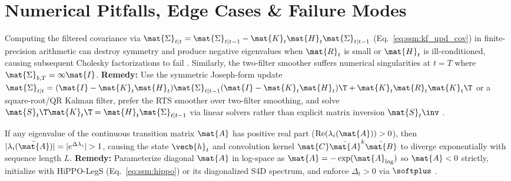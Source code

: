 \documentclass[../../../../master.tex]{subfiles}
\begin{document}
\section{Numerical Pitfalls, Edge Cases \& Failure Modes}\label{sec:ssm:pitfalls}

\begin{pitfall}
Computing the filtered covariance via $\mat{\Sigma}_{t|t} = \mat{\Sigma}_{t|t-1} - \mat{K}_t \mat{H}_t \mat{\Sigma}_{t|t-1}$ (Eq.~\eqref{eq:ssm:kf_upd_cov}) in finite-precision arithmetic can destroy symmetry and produce negative eigenvalues when $\mat{R}_t$ is small or $\mat{H}_t$ is ill-conditioned, causing subsequent Cholesky factorizations to fail . Similarly, the two-filter smoother suffers numerical singularities at $t=T$ where $\mat{\Sigma}_{b,T} = \infty \mat{I}$. \textbf{Remedy:} Use the symmetric Joseph-form update $\mat{\Sigma}_{t|t} = (\mat{I} - \mat{K}_t\mat{H}_t)\mat{\Sigma}_{t|t-1}(\mat{I} - \mat{K}_t\mat{H}_t)\T + \mat{K}_t \mat{R}_t \mat{K}_t\T$ or a square-root/QR Kalman filter, prefer the RTS smoother over two-filter smoothing, and solve $\mat{S}_t\T \mat{K}_t\T = \mat{H}_t \mat{\Sigma}_{t|t-1}$ via linear solvers rather than explicit matrix inversion $\mat{S}_t\inv$ .
\end{pitfall}

\begin{pitfall}
If any eigenvalue of the continuous transition matrix $\mat{A}$ has positive real part ($\mathrm{Re}(\lambda_i(\mat{A})) > 0$), then $|\lambda_i(\bar{\mat{A}})| = |e^{\Delta\lambda_i}| > 1$, causing the state $\vecb{h}_t$ and convolution kernel $\mat{C}\bar{\mat{A}}^k\bar{\mat{B}}$ to diverge exponentially with sequence length $L$. \textbf{Remedy:} Parameterize diagonal $\mat{A}$ in log-space as $\mat{A} = -\exp(\mat{A}_{\log})$ so $\mat{A} < 0$ strictly, initialize with HiPPO-LegS (Eq.~\eqref{eq:ssm:hippo}) or its diagonalized S4D spectrum, and enforce $\Delta_t > 0$ via $\softplus$ .
\end{pitfall}
\end{document}
